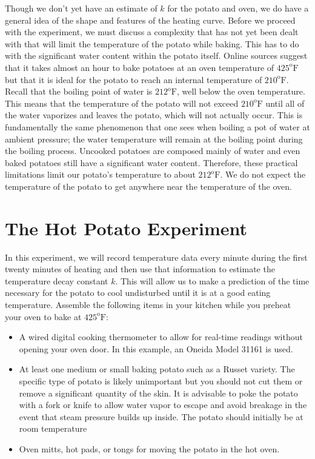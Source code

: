 \documentclass{ximera}
\begin{document}
Though we don't yet have an estimate of $k$ for the potato and oven, we do have a general idea of the shape and features of the heating curve.  Before we proceed with the experiment, we must discuss a complexity that has not yet been dealt with that will limit the temperature of the potato while baking.  This has to do with the significant water content within the potato itself.  Online sources suggest that it takes almost an hour to bake potatoes at an oven temperature of $425^{\text{o}}\text{F}$  but that it is ideal for the potato to reach an internal temperature of $210^{\text{o}}\text{F}$.  Recall that the boiling point of water is $212^{\text{o}}\text{F}$, well below the oven temperature.  This means that the temperature of the potato will not exceed $210^{\text{o}}\text{F}$  until all of the water vaporizes and leaves the potato, which will not actually occur. This is fundamentally the same phenomenon that one sees when boiling a pot of water at ambient pressure; the water temperature will remain at the boiling point during the boiling process.  Uncooked potatoes are composed mainly of water and even baked potatoes still have a significant water content.  Therefore, these practical limitations limit our potato's temperature to about $212^{\text{o}}\text{F}$.  We do not expect the temperature of the potato to get anywhere near the temperature of the oven.
 
 
\section*{The Hot Potato Experiment}
 
In this experiment, we will record temperature data every minute during the first twenty minutes of heating and then use that information to estimate the temperature decay constant $k$.  This will allow us to make a prediction of the time necessary for the potato to cool undisturbed until it is at a good eating temperature.
Assemble the following items in your kitchen while you preheat your oven to bake at $425^{\text{o}}\text{F}$:
\begin{itemize}
\item A wired digital cooking thermometer to allow for real-time readings without opening your oven door. In this example, an Oneida Model 31161 is used.
\item At least one medium or small baking potato such as a Russet variety. The specific type of potato is likely unimportant but you should not cut them or remove a significant quantity of the skin.  It is advisable to poke the potato with a fork or knife to allow water vapor to escape and avoid breakage in the event that steam pressure builds up inside.  The potato should initially be at room temperature
\item Oven mitts, hot pads, or tongs for moving the potato in the hot oven.
\end{itemize}
 
\end{document}
